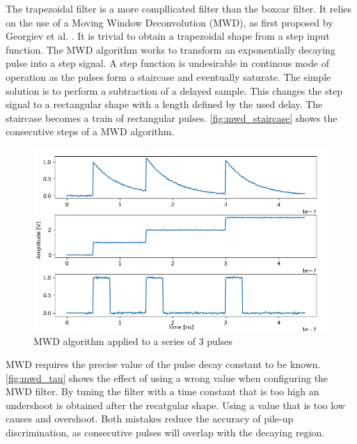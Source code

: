 The trapezoidal filter is a more compllicated filter than the boxcar filter.
It relies on the use of a Moving Window Deconvolution (MWD),
as first proposed by Georgiev et al. \cite{mwd}.
It is trivial to obtain a trapezoidal shape from a step input function.
The MWD algorithm works to transform an exponentially decaying pulse into 
a step signal. A step function is undesirable in continous mode of operation
as the pulses form a staircase and eventually saturate. The simple solution
is to perform a subtraction of a delayed sample. This changes the step signal
to a rectangular shape with a length defined by the used delay.
The staircase becomes a train of rectangular pulses.
\autoref{fig:mwd_staircase} shows the consecutive steps of a MWD algorithm.

\begin{figure}[H]
  \centering
  \includegraphics[width=\linewidth]{media/mwd_staircase.png}
  \caption{MWD algorithm applied to a series of 3 pulses}
  \label{fig:mwd_staircase} 
\end{figure}

MWD requires the precise value of the pulse decay constant to
be known. \autoref{fig:mwd_tau} shows the effect of using a wrong value
when configuring the MWD filter. By tuning the filter with a time constant
that is too high an undershoot is obtained after the recatgular shape.
Using a value that is too low causes and overshoot.
Both mistakes reduce the accuracy of pile-up discrimination, 
as consecutive pulses will overlap with the decaying region.


